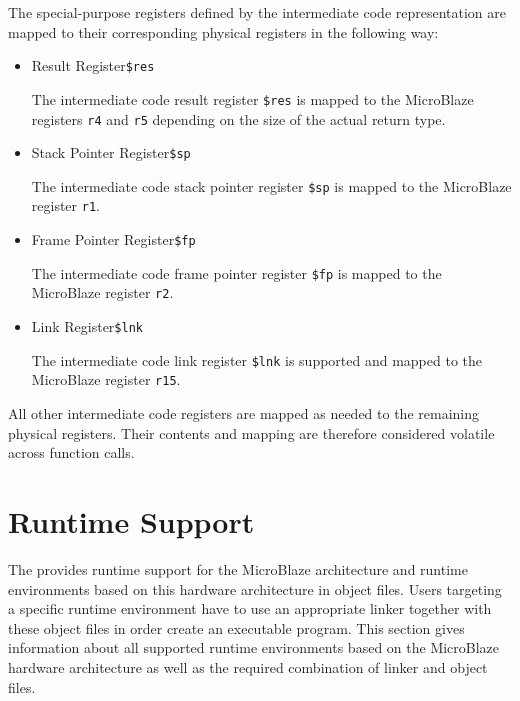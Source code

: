 The special-purpose registers defined by the intermediate code representation are mapped to their corresponding physical registers in the following way:

\begin{itemize}

\item Result Register\alignright\texttt{\$res}\nopagebreak

The intermediate code result register \texttt{\$res} is mapped to the MicroBlaze registers \texttt{r4} and \texttt{r5} depending on the size of the actual return type.

\item Stack Pointer Register\alignright\texttt{\$sp}\nopagebreak

The intermediate code stack pointer register \texttt{\$sp} is mapped to the MicroBlaze register \texttt{r1}.

\item Frame Pointer Register\alignright\texttt{\$fp}\nopagebreak

The intermediate code frame pointer register \texttt{\$fp} is mapped to the MicroBlaze register \texttt{r2}.

\item Link Register\alignright\texttt{\$lnk}\nopagebreak

The intermediate code link register \texttt{\$lnk} is supported and mapped to the MicroBlaze register \texttt{r15}.

\end{itemize}

All other intermediate code registers are mapped as needed to the remaining physical registers.
Their contents and mapping are therefore considered volatile across function calls.

\section{Runtime Support}

The \ecs{} provides runtime support for the MicroBlaze architecture and runtime environments based on this hardware architecture in object files.
Users targeting a specific runtime environment have to use an appropriate linker together with these object files in order create an executable program.
This section gives information about all supported runtime environments based on the MicroBlaze hardware architecture as well as the required combination of linker and object files.

